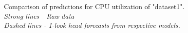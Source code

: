 Comparison of predictions for CPU utilization of "dataset1". \\
\textit{Strong lines - Raw data \\}
\textit{Dashed lines - 1-look head forecasts from respective models.}